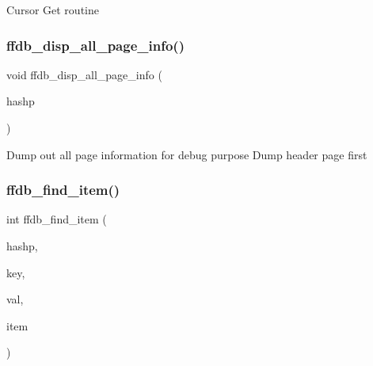 Cursor Get routine \mbox{\label{adat-devel_2other__libs_2filedb_2filehash_2ffdb__page_8c_ac254808e8682b803227a95d1af805d24}} 
\subsubsection{\texorpdfstring{ffdb\_disp\_all\_page\_info()}{ffdb\_disp\_all\_page\_info()}}
{\footnotesize\ttfamily void ffdb\+\_\+disp\+\_\+all\+\_\+page\+\_\+info (\begin{DoxyParamCaption}\item[{\mbox{\hyperlink{adat-devel_2other__libs_2filedb_2filehash_2ffdb__hash_8h_ae592010ed2bedc975d3cc0b7d074b9d1}{ffdb\+\_\+htab\+\_\+t}} $\ast$}]{hashp }\end{DoxyParamCaption})}

Dump out all page information for debug purpose Dump header page first\mbox{\label{adat-devel_2other__libs_2filedb_2filehash_2ffdb__page_8c_a6b562b83ef436a322dbd03ffc1970a91}} 
\subsubsection{\texorpdfstring{ffdb\_find\_item()}{ffdb\_find\_item()}}
{\footnotesize\ttfamily int ffdb\+\_\+find\+\_\+item (\begin{DoxyParamCaption}\item[{\mbox{\hyperlink{adat-devel_2other__libs_2filedb_2filehash_2ffdb__hash_8h_ae592010ed2bedc975d3cc0b7d074b9d1}{ffdb\+\_\+htab\+\_\+t}} $\ast$}]{hashp,  }\item[{\mbox{\hyperlink{adat-devel_2other__libs_2filedb_2filehash_2ffdb__db_8h_aa2e0984399491df0fdd20898ca8758f9}{F\+F\+D\+B\+\_\+\+D\+BT}} $\ast$}]{key,  }\item[{\mbox{\hyperlink{adat-devel_2other__libs_2filedb_2filehash_2ffdb__db_8h_aa2e0984399491df0fdd20898ca8758f9}{F\+F\+D\+B\+\_\+\+D\+BT}} $\ast$}]{val,  }\item[{\mbox{\hyperlink{adat-devel_2other__libs_2filedb_2filehash_2ffdb__hash_8h_aa1cea5ccbd6513ed152988f7a71a936d}{ffdb\+\_\+hent\+\_\+t}} $\ast$}]{item }\end{DoxyParamCaption})}

